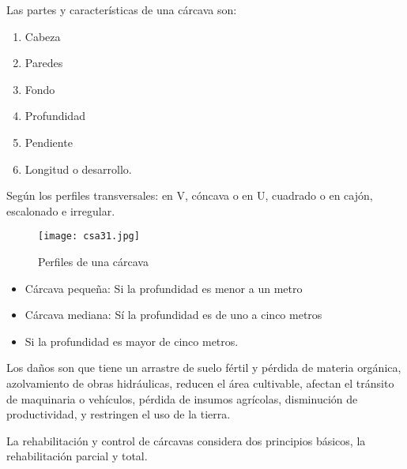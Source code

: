     Las partes y características de una cárcava son:
    \begin{enumerate}
        \item Cabeza
        \item Paredes
        \item Fondo
        \item Profundidad
        \item Pendiente
        \item Longitud o desarrollo.
    \end{enumerate}
    Según los perfiles transversales: en V, cóncava o en U, cuadrado o en cajón, escalonado e irregular.
    \begin{figure}[h!]
    \centering
      \texttt{[image: csa31.jpg]}
      \caption{Perfiles de una cárcava}
      \label{csa31}
    \end{figure}
    \begin{itemize}
        \item Cárcava pequeña: Si la profundidad es menor a un metro
        \item Cárcava mediana: Sí la profundidad es de uno a cinco metros
        \item Si la profundidad es mayor de cinco metros.
    \end{itemize}
    Los daños son que tiene un arrastre de suelo fértil y pérdida de materia orgánica, azolvamiento de obras hidráulicas, reducen el área cultivable, afectan el tránsito de maquinaria o vehículos, pérdida de insumos agrícolas, disminución de productividad, y restringen el uso de la tierra.
    
    La rehabilitación y control de cárcavas considera dos principios básicos, la rehabilitación parcial y total.
    
